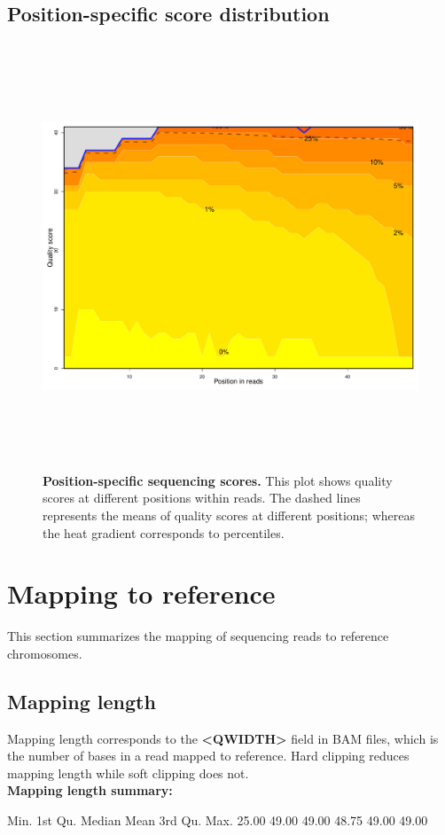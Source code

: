 \documentclass{article}
\begin{document}
\subsection{Position-specific score distribution}

\begin{center}
\begin{figure}[H]
\includegraphics[width=7in, height=5in, page=1]{bamchop-qual-position}
\caption{\textbf{Position-specific sequencing scores.} This plot shows quality scores at different positions within reads. The dashed lines represents the means of quality scores at different positions; whereas the heat gradient corresponds to percentiles.}
\end{figure}
\end{center}


\pagebreak
\section{Mapping to reference}
This section summarizes the mapping of sequencing reads to reference chromosomes.
\subsection{Mapping length}
Mapping length corresponds to the \textbf{<QWIDTH>} field in BAM files, which is the number of bases in a read mapped to reference. Hard clipping reduces mapping length while soft clipping does not.
\vspace*{1\baselineskip}
\\{\textbf{Mapping length summary:}}
\begin{Schunk}
\begin{Soutput}
   Min. 1st Qu.  Median    Mean 3rd Qu.    Max. 
  25.00   49.00   49.00   48.75   49.00   49.00 
\end{Soutput}
\end{Schunk}
\end{document}
